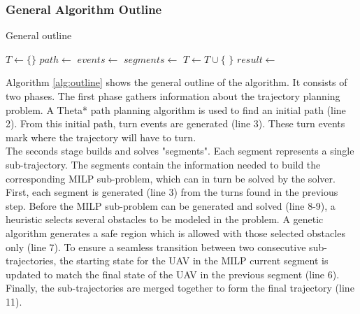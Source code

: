 \subsubsection{General Algorithm Outline}
\begin{algorithm}
\caption{General outline}
\label{alg:outline}
\begin{algorithmic}[1]
\State $T \leftarrow \{\}$ 
\State $path \leftarrow$ 
\State $events \leftarrow$ 
\State $segments \leftarrow$ 
\State {}
\State {}
\State {}
\State $T \leftarrow T \cup \{$  $\}$
\EndFor
\State $result \leftarrow $
\end{algorithmic}
\end{algorithm}

Algorithm \ref{alg:outline} shows the general outline of the algorithm. It consists of two phases. The first phase gathers information about the trajectory planning problem. A Theta* path planning algorithm is used to find an initial path (line 2). From this initial path, turn events are generated (line 3). These turn events mark where the trajectory will have to turn. \\
The seconds stage builds and solves "segments". Each segment represents a single sub-trajectory. The segments contain the information needed to build the corresponding MILP sub-problem, which can in turn be solved by the solver. First, each segment is generated (line 3) from the turns found in the previous step. Before the MILP sub-problem can be generated and solved (line 8-9), a heuristic selects several obstacles to be modeled in the problem. A genetic algorithm generates a safe region which is allowed with those selected obstacles only (line 7). To ensure a seamless transition between two consecutive sub-trajectories, the starting state for the UAV in the MILP current segment is updated to match the final state of the UAV in the previous segment (line 6). Finally, the sub-trajectories are merged together to form the final trajectory (line 11).

